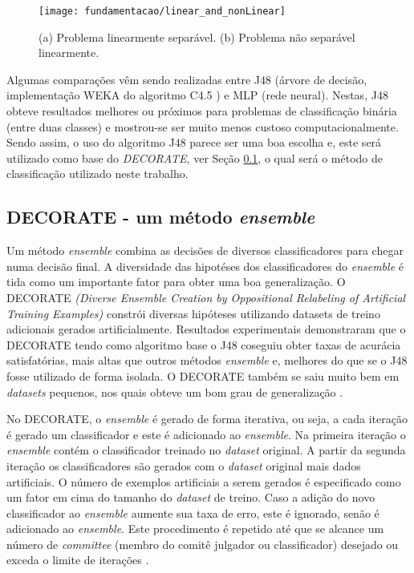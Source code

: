 \begin{figure}[!htb] \centering 
  \centering
  \texttt{[image: fundamentacao/linear\_and\_nonLinear]} 
  \caption{(a) Problema linearmente separável. (b) Problema não separável linearmente. \cite{Elizondo:2006}} 
  \label{fig:slseparablenonseparable}
\end{figure}

Algumas comparações \cite{Firdausi:2010, Arora:2012, Karthikeyan:2013} vêm sendo realizadas entre J48 (árvore de decisão, implementação WEKA \cite{Hall:2009} do algoritmo C4.5 \cite{Quinlan:1993}) e MLP (rede neural). Nestas, J48 obteve resultados melhores ou próximos para problemas de classificação binária (entre duas classes) e mostrou-se ser muito menos custoso computacionalmente. Sendo assim, o uso do algoritmo J48 parece ser uma boa escolha e, este será utilizado como base do \textit{DECORATE}, ver Seção \ref{subsec:decoration}, o qual será o método de classificação utilizado neste trabalho.

\subsection{DECORATE - um método \textit{ensemble}}
\label{subsec:decoration}
Um método \textit{ensemble} combina as decisões de diversos classificadores para chegar numa decisão final. A diversidade das hipotéses dos classificadores do \textit{ensemble} é tida como um importante fator para obter uma boa generalização. O DECORATE \textit{(Diverse Ensemble Creation by Oppositional Relabeling of Artificial Training Examples)} constrói diversas hipóteses utilizando datasets de treino adicionais gerados artificialmente. Resultados experimentais demonstraram que o DECORATE tendo como algoritmo base o J48 coseguiu obter taxas de acurácia satisfatórias, mais altas que outros métodos \textit{ensemble} e, melhores do que se o J48 fosse utilizado de forma isolada. O DECORATE também se saiu muito bem em \textit{datasets} pequenos, nos quais obteve um bom grau de generalização \cite{Melville:2003, Melville:2004}.

No DECORATE, o \textit{ensemble} é gerado de forma iterativa, ou seja, a cada iteração é gerado um classificador e este é adicionado ao \textit{ensemble}. Na primeira iteração o \textit{ensemble} contém o classificador treinado no \textit{dataset} original. A partir da segunda iteração os classificadores são gerados com o \textit{dataset} original mais dados artificiais. O número de exemplos artificiais a serem gerados é especificado como um fator em cima do tamanho do \textit{dataset} de treino. Caso a adição do novo classificador ao \textit{ensemble} aumente sua taxa de erro, este é ignorado, senão é adicionado ao \textit{ensemble}. Este procedimento é repetido até que se alcance um número de \textit{committee} (membro do comitê julgador ou classificador) desejado ou exceda o limite de iterações \cite{Melville:2003}.

